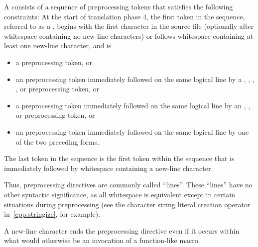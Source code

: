 \begin{bnf}
\br
\end{bnf}

\pnum
A  consists of a sequence of preprocessing tokens
that satisfies the following constraints:
At the start of translation phase 4,
the first token in the sequence,
referred to as a ,
begins with the first character in the source file
(optionally after whitespace containing no new-line characters) or
follows whitespace containing at least one new-line character,
and is
\begin{itemize}
\item
a \tcode{\#} preprocessing token, or

\item
an  preprocessing token
immediately followed on the same logical line by a
,
\tcode{<},
,
, or
\tcode{:}
preprocessing token, or

\item
a  preprocessing token
immediately followed on the same logical line by an
,
\tcode{:}, or
\tcode{;}
preprocessing token, or

\item
an  preprocessing token
immediately followed on the same logical line by
one of the two preceding forms.
\end{itemize}

The last token in the sequence is the first token within the sequence that
is immediately followed by whitespace containing a new-line character.
\begin{footnote}
Thus,
preprocessing directives are commonly called ``lines''.
These ``lines'' have no other syntactic significance,
as all whitespace is equivalent except in certain situations
during preprocessing (see the
\tcode{\#}
character string literal creation operator in~\ref{cpp.stringize}, for example).
\end{footnote}
\begin{note}
A new-line character ends the preprocessing directive even if it occurs
within what would otherwise be an invocation of a function-like macro.
\end{note}

